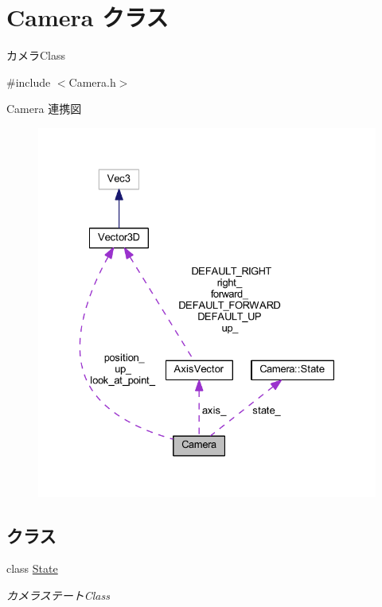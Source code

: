 \hypertarget{class_camera}{}\section{Camera クラス}
\label{class_camera}


カメラ\+Class  




{\ttfamily \#include $<$Camera.\+h$>$}



Camera 連携図\nopagebreak
\begin{figure}[H]
\begin{center}
\leavevmode
\includegraphics[width=328pt]{class_camera__coll__graph}
\end{center}
\end{figure}
\subsection*{クラス}
\begin{DoxyCompactItemize}
\item 
class \mbox{\hyperlink{class_camera_1_1_state}{State}}
\begin{DoxyCompactList}\small\item\em カメラステート\+Class \end{DoxyCompactList}\end{DoxyCompactItemize}
